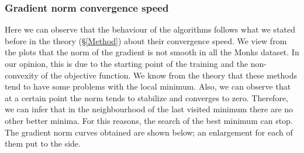 \subsubsection{Gradient norm convergence speed}
\label{sec:gradient_norm_convergence_speed}
Here we can observe that the behaviour of the algorithms follows what we stated before in the theory (\S \ref{Method}) about their convergence speed. We view from the plots that the norm of the gradient is not smooth in all the Monks dataset. In our opinion, this is due to the starting point of the training and the non-convexity of the objective function. We know from the theory that these methods tend to have some problems with the local minimum. Also, we can observe that at a certain point the norm tends to stabilize and converges to zero. Therefore, we can infer that in the neighbourhood of the last visited minimum there are no other better minima. For this reasons, the search of the best minimum can stop. The gradient norm curves obtained are shown below; an enlargement for each of them put to the side.
